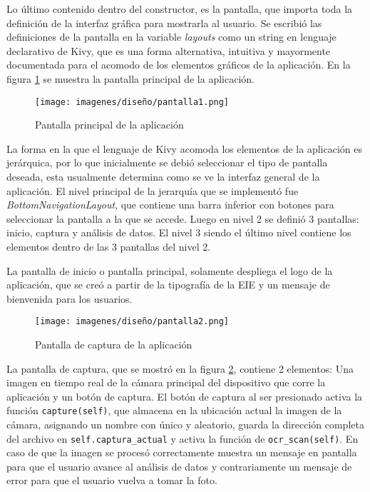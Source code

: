  \par
 Lo último contenido dentro del constructor, es la pantalla, que importa toda la definición de la interfaz gráfica para mostrarla al usuario. Se escribió las definiciones de la pantalla en la variable \textit{layouts} como un string en lenguaje declarativo de Kivy, que es una forma alternativa, intuitiva y mayormente documentada para el acomodo de los elementos gráficos de la aplicación. En la figura \ref{screen1} se muestra la pantalla principal de la aplicación.
\begin{figure}[H]
    \centering
    \texttt{[image: imagenes/diseño/pantalla1.png]}
    \caption{Pantalla principal de la aplicación}
    \label{screen1}
\end{figure}
\par
La forma en la que el lenguaje de Kivy acomoda los elementos de la aplicación es jerárquica, por lo que inicialmente se debió seleccionar el tipo de pantalla deseada, esta usualmente determina como se ve la interfaz general de la aplicación. El nivel principal de la jerarquía que se implementó fue \textit{BottomNavigationLayout}, que contiene una barra inferior con botones para seleccionar la pantalla a la que se accede. Luego en nivel 2 se definió 3 pantallas: inicio, captura y análisis de datos. El nivel 3 siendo el último nivel contiene los elementos dentro de las 3 pantallas del nivel 2.
\par
La pantalla de inicio o pantalla principal, solamente despliega el logo de la aplicación, que se creó a partir de la tipografía de la EIE y un mensaje de bienvenida para los usuarios. 
\par
\begin{figure}[H]
    \centering
    \texttt{[image: imagenes/diseño/pantalla2.png]}
    \caption{Pantalla de captura de la aplicación}
    \label{screen2}
\end{figure}
\par
La pantalla de captura, que se mostró en la figura \ref{screen2}, contiene 2 elementos: Una imagen en tiempo real de la cámara principal del dispositivo que corre la aplicación y un botón de captura. El botón de captura al ser presionado activa la función \verb|capture(self)|, que almacena en la ubicación actual la imagen de la cámara, asignando un nombre con único y aleatorio, guarda la dirección completa del archivo en \verb|self.captura_actual| y activa la función de \verb|ocr_scan(self)|. En caso de que la imagen se procesó correctamente muestra un mensaje en pantalla para que el usuario avance al análisis de datos y contrariamente un mensaje de error para que el usuario vuelva a tomar la foto.
